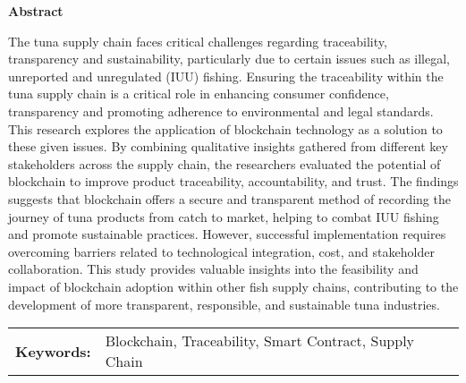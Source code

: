 \begin{center}
\textbf{Abstract}
\end{center}
\setlength{\parindent}{0pt}
The tuna supply chain faces critical challenges regarding traceability, transparency and sustainability, particularly due to certain issues such as illegal, unreported and unregulated (IUU) fishing. Ensuring the traceability within the tuna supply chain is a critical role in enhancing consumer confidence, transparency and promoting adherence to environmental and legal standards. This research explores the application of blockchain technology as a solution to these given issues. By combining qualitative insights gathered from different key stakeholders across the supply chain, the researchers evaluated the potential of blockchain to improve product traceability, accountability, and trust. The findings suggests that blockchain offers a secure and transparent method of recording the journey of tuna products from catch to market, helping to combat IUU fishing and promote sustainable practices. However, successful implementation requires overcoming barriers related to technological integration, cost, and stakeholder collaboration. This study provides valuable insights into the feasibility and impact of blockchain adoption within other fish supply chains, contributing to the development of more transparent, responsible, and sustainable tuna industries.

\begin{tabular}{lp{4.25in}}
\hspace{-0.5em}\textbf{Keywords:}\hspace{0.25em} & Blockchain, Traceability, Smart Contract, Supply Chain\\
\end{tabular}
